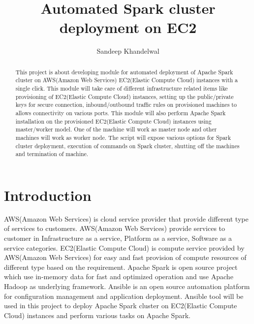 
\title{Automated Spark cluster deployment on EC2}


\author{Sandeep Khandelwal}


\renewcommand{\shortauthors}{Sandeep}


\begin{abstract}
This project is about developing module for automated deployment of Apache Spark\cite{hid-sp18-511-www-spark} cluster on AWS(Amazon Web Services)\cite{hid-sp18-511-www-aws} EC2(Elastic Compute Cloud)\cite{hid-sp18-511-www-ec2} instances with a single click. This module will take care of different infrastructure related items like provisioning of EC2(Elastic Compute Cloud)\cite{hid-sp18-511-www-ec2} instances, setting up the public/private keys for secure connection, inbound/outbound traffic rules on provisioned machines to allows connectivity on various ports. This module will also perform Apache Spark\cite{hid-sp18-511-www-spark} installation on the provisioned EC2(Elastic Compute Cloud)\cite{hid-sp18-511-www-ec2} instances using master/worker model. One of the machine will work as master node and other machines will work as worker node. The script will expose various options for Spark cluster deployment, execution of commands on Spark cluster, shutting off the machines and termination of machine.
\end{abstract}



\maketitle

\section{Introduction}

AWS(Amazon Web Services)\cite{hid-sp18-511-www-aws} is cloud service provider that provide different type of services to customers. AWS(Amazon Web Services)\cite{hid-sp18-511-www-aws} provide services to customer in Infrastructure as a service, Platform as a service, Software as a service categories. EC2(Elastic Compute Cloud)\cite{hid-sp18-511-www-ec2} is compute service provided by AWS(Amazon Web Services)\cite{hid-sp18-511-www-aws} for easy and fast provision of compute resources of different type based on the requirement. Apache Spark\cite{hid-sp18-511-www-spark} is open source project which use in-memory data for fast and optimized operation and use Apache  Hadoop\cite{hid-sp18-511-www-hadoop} as underlying framework. Ansible\cite{bibid} is an open source automation platform for configuration management and application deployment. Ansible\cite{hid-sp18-511-www-ansible} tool will be used in this project to deploy Apache Spark\cite{hid-sp18-511-www-spark} cluster on EC2(Elastic Compute Cloud)\cite{hid-sp18-511-www-ec2} instances and perform various tasks on Apache Spark\cite{hid-sp18-511-www-spark}.

